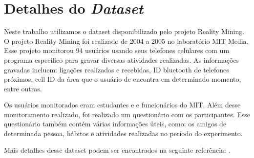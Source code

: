 \section{Detalhes do \textit{Dataset}}\label{modelagem}

Neste trabalho utilizamos o dataset disponibilizado pelo projeto Reality
Mining. O projeto Reality Mining foi realizado de 2004 a 2005 no
laboratório MIT Media. Esse projeto monitorou 94 usuários usando seus
telefones celulares com um programa específico para gravar diversas
atividades realizadas. As informações gravadas incluem: ligações
realizadas e recebidas, ID bluetooth de telefones próximos, cell ID da
área que o usuário de encontra em determinado momento, entre outras.

Os usuários monitorados eram estudantes e e funcionários do MIT. Além
desse monitoramento realizado, foi realizado um questionário com os
participantes. Esse questionário também contém várias informações úteis,
como: os amigos de determinada pessoa, hábitos e atividades realizadas
no período do experimento. 

Mais detalhes desse dataset podem ser encontrados na seguinte
referência: \cite{eagle2007isn}.
